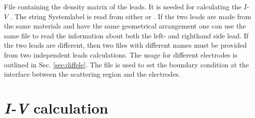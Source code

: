 \documentclass[11pt]{article}
\begin{document}
{File containing the density matrix of the leads. It is needed for calculating the $I$-$V$ . The string Systemlabel is read from either  or . If the two leads are made from the same materials and have the same geometrical arrangement one can use the same  file to read the information about both the left- and righthand side lead. If the two leads are different, then two files with different names must be provided from two independent leads calculations. The usage for different electrodes is outlined in Sec. \ref{sec:diffele}. The  file is used to set the boundary condition at the interface between the scattering region and the electrodes.}

\section{\textit{I-V} calculation}
\end{document}
